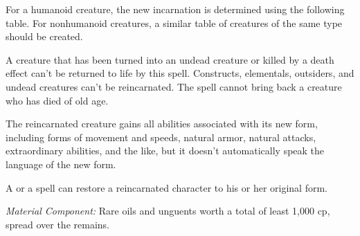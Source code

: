 {	For a humanoid creature, the new incarnation is determined using the following table. For nonhumanoid creatures, a similar table of creatures of the same type should be created.

	A creature that has been turned into an undead creature or killed by a death effect can't be returned to life by this spell.  Constructs, elementals, outsiders, and undead creatures can't be reincarnated. The spell cannot bring back a creature who has died of old age.


	The reincarnated creature gains all abilities associated with its new form, including forms of movement and speeds, natural armor, natural attacks, extraordinary abilities, and the like, but it doesn't automatically speak the language of the new form.

	A  or a  spell can restore a reincarnated character to his or her original form.

	\textit{Material Component:}
	Rare oils and unguents worth a total of least 1,000 cp, spread over the remains.

}
